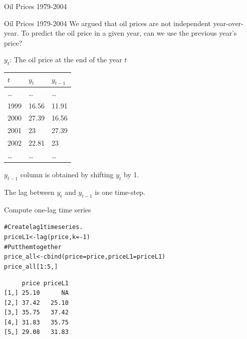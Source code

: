 \documentclass{beamer}\usepackage[]{graphicx}\usepackage[]{color}
\makeatletter
\newcommand{\hlnum}[1]{\textcolor[rgb]{0.824,0.412,0.118}{#1}}%
\newcommand{\hlcom}[1]{\textcolor[rgb]{0.824,0.706,0.549}{#1}}%
\newcommand{\hlopt}[1]{\textcolor[rgb]{1,0.894,0.769}{#1}}%
\newcommand{\hlstd}[1]{\textcolor[rgb]{1,0.894,0.769}{#1}}%
\newcommand{\hlkwb}[1]{\textcolor[rgb]{0.804,0.776,0.451}{#1}}%
\newcommand{\hlkwc}[1]{\textcolor[rgb]{0.78,0.941,0.545}{#1}}%
\newcommand{\hlkwd}[1]{\textcolor[rgb]{1,0.78,0.769}{#1}}%
\newenvironment{kframe}{%
 \def\at@end@of@kframe{}%
 \ifinner\ifhmode%
  \def\at@end@of@kframe{\end{minipage}}%
  \begin{minipage}{\columnwidth}%
 \fi\fi%
 \def\FrameCommand##1{\hskip\@totalleftmargin \hskip-\fboxsep
 \colorbox{shadecolor}{##1}\hskip-\fboxsep
     \hskip-\linewidth \hskip-\@totalleftmargin \hskip\columnwidth}%
 \MakeFramed {\advance\hsize-\width
   \@totalleftmargin\z@ \linewidth\hsize
   \@setminipage}}%
 {\par\unskip\endMakeFramed%
 \at@end@of@kframe}
\newenvironment{knitrout}{}{} %
\makeatother
\begin{document}
\begin{darkframes}
\begin{frame}[fragile]{Oil Prices 1979-2004}
\begin{knitrout}
\end{knitrout}
    \end{frame}
  
    
    
    \begin{frame}[fragile]{Oil Prices 1979-2004}
      We argued that oil prices are not independent year-over-year. \pause To predict the oil price in a given year, can we use the previous year's price? \pause
      
      \begin{center}
        $y_t$: The oil price at the end of the year $t$ \pause\bigskip

        \begin{tabular}{lll}
          \hline
            $t$ & $y_t$ &  $y_{t-1}$\\
          \hline
          \ldots & \ldots & \ldots \\
          1999	& 16.56 & 11.91 \\
          2000 &	27.39 & 16.56  \\
          2001	& 23 & 27.39 \\
          2002	& 22.81 & 23 \\
          \ldots & \ldots & \ldots \\
          \hline 
        \end{tabular}
      \end{center}
      \pause
      
      $y_{t-1}$ column is obtained by shifting $y_t$ by 1. \pause
      
      The \alert{lag} between $y_t$ and $y_{t-1}$ is one time-step.
    
    \end{frame}
    
    
    \begin{frame}[fragile]{Compute one-lag time series}
      \fontsize{10}{10}\selectfont
\begin{knitrout}
\begin{kframe}
\begin{alltt}
\hlcom{# Create lag 1 time series.}
\hlstd{priceL1} \hlkwb{<-} \hlkwd{lag}\hlstd{(price,} \hlkwc{k}\hlstd{=}\hlopt{-}\hlnum{1}\hlstd{)}
\hlcom{# Put them together}
\hlstd{price_all} \hlkwb{<-} \hlkwd{cbind}\hlstd{(}\hlkwc{price}\hlstd{=price,} \hlkwc{priceL1}\hlstd{=priceL1)}
\hlstd{price_all[}\hlnum{1}\hlopt{:}\hlnum{5}\hlstd{,]}
\end{alltt}
\begin{verbatim}
     price priceL1
[1,] 25.10      NA
[2,] 37.42   25.10
[3,] 35.75   37.42
[4,] 31.83   35.75
[5,] 29.08   31.83
\end{verbatim}
\end{kframe}
\end{knitrout}
      \pause
      

\end{frame}
\end{darkframes}
\end{document}
